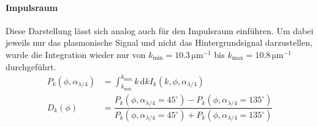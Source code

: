 \documentclass[titlepage,  ngerman]{article}
\begin{document}
		\paragraph{Impulsraum}
		Diese Darstellung lässt sich analog auch für den Impulsraum einführen. Um dabei jeweils nur das plasmonische Signal und nicht das Hintergrundsignal darzustellen, wurde die Integration wieder nur von  $k_\mathrm{min} = 10.3\,\mathrm{\mu m}^{-1}$ bis $k_\mathrm{max} = 10.8\,\mathrm{\mu m}^{-1}$ durchgeführt.
		\begin{align}
			P_k(\phi, \alpha_{\lambda/4}) &= \int_{k_\mathrm{min}}^{k_\mathrm{max}}k\,\mathrm{d}k I_k(k, \phi, \alpha_{\lambda /4}) \\
			D_k(\phi) &= \dfrac{P_k(\phi, \alpha_{\lambda/4} = 45^\circ) - P_k(\phi, \alpha_{\lambda/4} = 135^\circ)}{P_k(\phi, \alpha_{\lambda/4} = 45^\circ) + P_k(\phi, \alpha_{\lambda/4} = 135^\circ)}
		\end{align}
\end{document}
